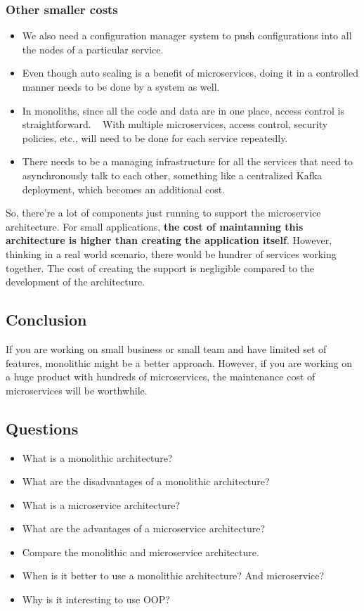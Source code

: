 \subsubsection{Other smaller costs}

\begin{itemize}
    \item We also need a configuration manager system to push configurations into all 
    the nodes of a particular service.
    \item Even though auto scaling is a benefit of microservices, doing it in a controlled 
    manner needs to be done by a system as well.
    \item In monoliths, since all the code and data are in one place, access control is straightforward. ~
    With multiple microservices, access control, security policies, etc., will need to be done for each service repeatedly.
    \item There needs to be a managing infrastructure for all the services that need to asynchronously talk to each other,
    something like a centralized Kafka deployment, which becomes an additional cost.
\end{itemize}

So, there're a lot of components just running to support the microservice architecture. 
For small applications, \textbf{the cost of maintanning this architecture is higher than creating 
the application itself}. However, thinking in a real world scenario, there would be hundrer of 
services working together. The cost of creating the support is negligible compared to the development
of the architecture.  

\subsection{Conclusion}
If you are working on small business or small team and have limited set of features, 
monolithic might be a better approach. However, if you are working on a huge product with
hundreds of microservices, the maintenance cost of microservices will be worthwhile. 


\subsection{Questions}

\begin{itemize}
    \item What is a monolithic architecture?
    \item What are the disadvantages of a monolithic architecture?
    \item What is a microservice architecture? 
    \item What are the advantages of a microservice architecture? 
    \item Compare the monolithic and microservice architecture. 
    \item When is it better to use a monolithic architecture? And microservice? 
    \item Why is it interesting to use OOP? 
\end{itemize}